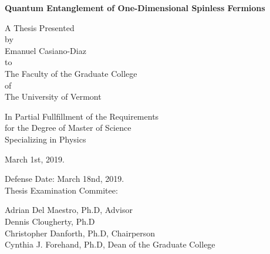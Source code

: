 \documentclass[12pt, two sided]{report}
\begin{document}
\begin{titlepage}
	\begin{center}
		\vspace{1cm}
				
		\Huge
		\textbf{Quantum Entanglement of One-Dimensional Spinless Fermions}
		
		
		\vfill
		
		\normalsize
		A Thesis Presented \\
		\vspace{0.5cm}
		by \\
		\vspace{0.5cm}
		Emanuel Casiano-Diaz \\
		\vspace{0.5cm}
		to \\
		\vspace{0.5cm}
		The Faculty of the Graduate College \\
		\vspace{0.5cm}
		of \\
		\vspace{0.5cm}
		The University of Vermont
		
		\vspace{2.0cm}

	
		In Partial Fullfillment of the Requirements \\
		for the Degree of Master of Science \\
		Specializing in Physics	
			
		\vspace{0.75cm}
		
		March 1st, 2019.
		
	\end{center}
	
	\vspace{0.5cm}
	
	\begin{flushright}
		Defense Date: March 18nd, 2019. \\
		Thesis Examination Commitee:
		
		\vspace{0.5cm}
		
		Adrian Del Maestro, Ph.D, Advisor \\
		Dennis Clougherty, Ph.D \\
		Christopher Danforth, Ph.D, Chairperson \\
		Cynthia J. Forehand, Ph.D, Dean of the Graduate College
		
	
	\end{flushright}
\end{titlepage}
\end{document}
